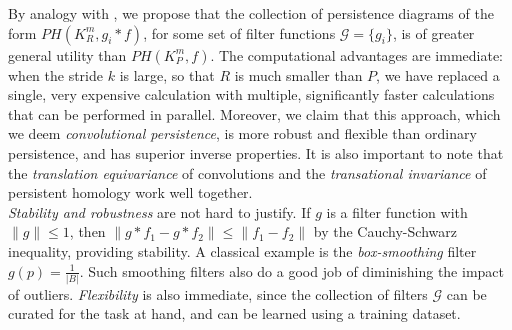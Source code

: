 \documentclass[conference]{IEEEtran}
\theoremstyle{definition}
\numberwithin{figure}{section}
\begin{document}
By analogy with \cite{solomon2021fast,solomon2021geometry}, we propose that the collection of persistence diagrams of the form $PH(K_{R}^{m},g_{i} \ast f)$, for some set of filter functions $\mathcal{G} = \{g_i\}$, is of greater general utility than $PH(K_{P}^{m},f)$. The computational advantages are immediate: when the stride $k$ is large, so that $R$ is much smaller than $P$, we have replaced a single, very expensive calculation with multiple, significantly faster calculations that can be performed in parallel. Moreover, we claim that this approach, which we deem \emph{convolutional persistence}, is more robust and flexible than ordinary persistence, and has superior inverse properties. It is also important to note that the \emph{translation equivariance} of convolutions and the \emph{transational invariance} of persistent homology work well together.\\


\emph{Stability and robustness} are not hard to justify. If $g$ is a filter function with $\|g\| \leq 1$, then $\|g \ast f_1 - g \ast f_2 \| \leq \|f_1 - f_2\|$ by the Cauchy-Schwarz inequality, providing stability. A classical example is the \emph{box-smoothing} filter $g(p) = \frac{1}{|B|}$. Such smoothing filters also do a good job of diminishing the impact of outliers. \emph{Flexibility} is also immediate, since the collection of filters $\mathcal{G}$ can be curated for the task at hand, and can be learned using a training dataset.\\
\end{document}
